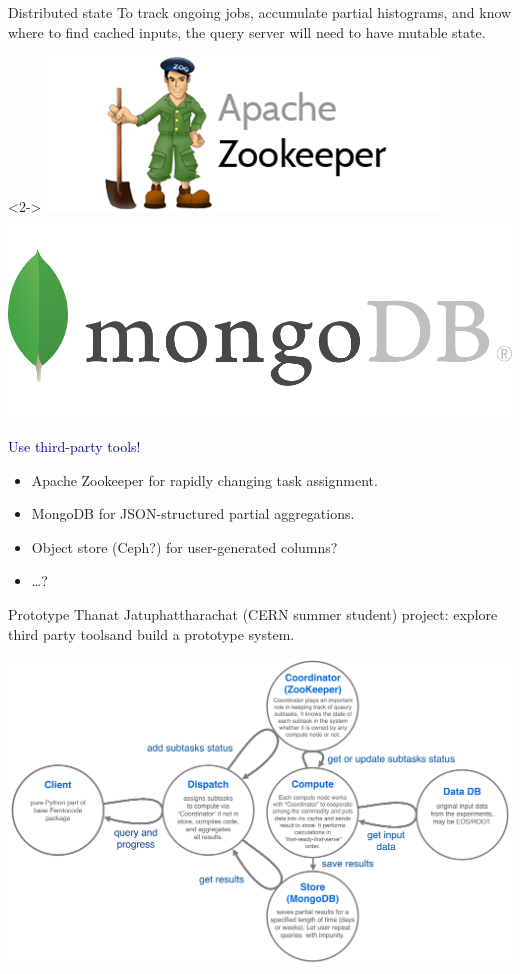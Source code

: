 \documentclass{beamer}
\begin{document}
\begin{frame}{Distributed state}
\vspace{0.5 cm}
To track ongoing jobs, accumulate partial histograms, and know where to find cached inputs, the query server will need to have mutable state.

\vspace{0.3 cm}
\begin{uncoverenv}<2->
\hfill \includegraphics[height=1.2 cm]{zookeeper.png} \includegraphics[height=1.2 cm]{mongodb.png}

\vspace{-0.5 cm}
\textcolor{darkblue}{Use third-party tools!}
\begin{itemize}
\item Apache Zookeeper for rapidly changing task assignment.
\item MongoDB for JSON-structured partial aggregations.
\item Object store (Ceph?) for user-generated columns?
\item \ldots?
\end{itemize}
\end{uncoverenv}

\vspace{0.5 cm}
\end{frame}

\begin{frame}{Prototype}
\vspace{0.5 cm}
Thanat Jatuphattharachat (CERN summer student) project: explore third party tools\footnotemark[1] and build a prototype system\footnotemark[2].

\begin{center}
\includegraphics[width=0.75\linewidth]{distributed-layout.png}
\end{center}

\end{frame}
\end{document}
